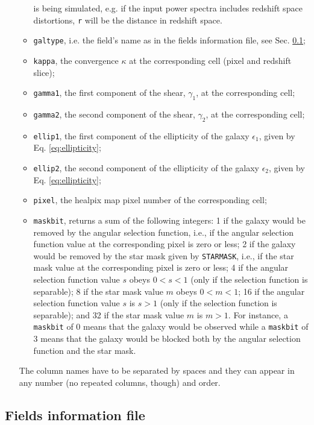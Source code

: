 \documentclass[12pt]{book} %
\begin{document}
\begin{itemize}
\begin{itemize}
    is being simulated, e.g. if the input power spectra includes redshift space distortions, {\tt r} 
    will be the distance in redshift space. 
  \item {\tt galtype}, i.e. the field's name as in the fields information file, see Sec. \ref{sec:fields-info}; 
  \item {\tt kappa}, the convergence $\kappa$ at the corresponding cell (pixel and redshift slice);
  \item {\tt gamma1}, the first component of the shear, $\gamma_1$, at the corresponding cell;
  \item {\tt gamma2}, the second component of the shear, $\gamma_2$, at the corresponding cell; 
  \item {\tt ellip1}, the first component of the ellipticity of the galaxy $\epsilon_1$, 
    given by Eq. \ref{eq:ellipticity}; 
  \item {\tt ellip2}, the second component of the ellipticity of the galaxy $\epsilon_2$, 
    given by Eq. \ref{eq:ellipticity};
  \item {\tt pixel}, the {\sc healpix} map pixel number of the corresponding cell; 
  \item {\tt maskbit}, returns a sum of the following integers: 1 if the galaxy would 
    be removed by the angular selection function, i.e., if the angular selection function value 
    at the corresponding pixel is zero or less; 2 if the galaxy would be removed by the star mask 
    given by {\tt STARMASK}, i.e., if the star mask value at the corresponding pixel is zero or less; 
    4 if the angular selection function value $s$ obeys $0<s<1$ (only if the selection function is 
    separable); 8 if the star mask value $m$ obeys $0<m<1$; 16 if the angular selection 
    function value $s$ is $s>1$ (only if the selection function is separable); and 32 
    if the star mask value $m$ is $m>1$. For instance, a {\tt maskbit} of 0 means that the galaxy would be observed 
    while a {\tt maskbit} of 3 means that the galaxy would be blocked both by the angular selection
    function and the star mask.
  \end{itemize}
  The column names have to be separated by spaces and they can appear in any number (no repeated 
  columns, though) and order.
\end{itemize}


\subsection{Fields information file}
\label{sec:fields-info}
\end{document}

